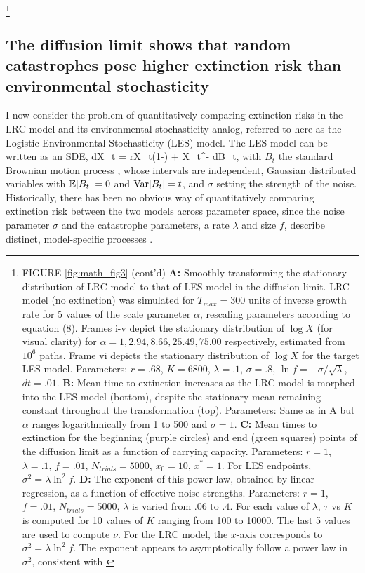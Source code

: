 {\let\thefootnote\relax\footnote{FIGURE \ref{fig:math_fig3} (cont'd) \textbf{A:  }Smoothly transforming the stationary distribution of LRC model to that of LES model in the diffusion limit.  LRC model (no extinction) was simulated for $T_{max} = 300$ units of inverse growth rate for 5 values of the scale parameter $\alpha$, rescaling parameters according to equation (8).  Frames i-v depict the stationary distribution of $\log X$ (for visual clarity) for $\alpha = 1, 2.94, 8.66, 25.49, 75.00$ respectively, estimated from $10^6$ paths.  Frame vi depicts the stationary distribution of $\log X$ for the target LES model.  Parameters:  $r = .68$, $K = 6800$, $\lambda = .1$, $\sigma = .8$, $\ln f = -\sigma/\sqrt{\lambda}$, $dt = .01$.  \textbf{B: }  Mean time to extinction increases as the LRC model is morphed into the LES model (bottom), despite the stationary mean remaining constant throughout the transformation (top).  Parameters:  Same as in A but $\alpha$ ranges logarithmically from 1 to 500 and $\sigma = 1$.  \textbf{C:  } Mean times to extinction for the beginning (purple circles) and end (green squares) points of the diffusion limit as a function of carrying capacity.  Parameters:  $r = 1$, $\lambda = .1$, $f = .01$, $N_{trials} = 5000$, $x_0 = 10$, $x^* = 1$.  For LES endpoints, $\sigma^2 = \lambda \ln^2f$.  \textbf{D:  } The exponent of this power law, obtained by linear regression, as a function of effective noise strengths.  Parameters:  $r = 1$, $f = .01$, $N_{trials} = 5000$, $\lambda$ is varied from $.06$ to $.4$.  For each value of $\lambda$, $\tau$ vs $K$ is computed for 10 values of $K$ ranging from 100 to 10000.  The last 5 values are used to compute $\nu$.  For the LRC model, the $x$-axis corresponds to $\sigma^2 = \lambda\ln^2f$.  The exponent appears to asymptotically follow a power law in $\sigma^2$, consistent with \cite{lande1993risks}}}
		
\subsection{The diffusion limit shows that random catastrophes pose higher extinction risk than environmental stochasticity}

I now consider the problem of quantitatively comparing extinction risks in the LRC model and its environmental stochasticity analog, referred to here as the Logistic Environmental Stochasticity (LES) model.  The LES model can be written as an SDE,
\be
dX_t = rX_t\left(1-\right) + \sigma X_{t^-} dB_t,
\ee
\noindent with $B_t$ the standard Brownian motion process \cite{hansonBook,karlin1981second}, whose intervals are independent, Gaussian distributed variables with $\mathbb{E}[B_t] = 0$ and $\text{Var}[B_t] = t$,  and $\sigma$ setting the strength of the noise.  Historically, there has been no obvious way of quantitatively comparing extinction risk between the two models across parameter space, since the noise parameter $\sigma$ and the catastrophe parameters, a rate $\lambda$ and size $f$, describe distinct, model-specific processes \cite{lande1993risks, landeBook, shaffer1987minimum}.  

